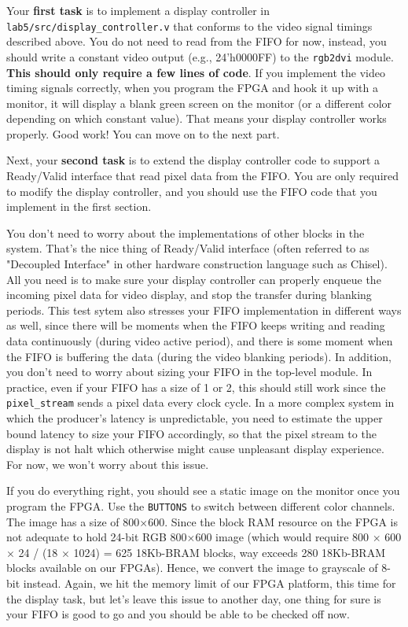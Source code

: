 \documentclass[11pt]{article}
\begin{document}
Your \textbf{first task} is to implement a display controller in \verb|lab5/src/display_controller.v| that conforms to the video signal timings described above. You do not need to read from the FIFO for now, instead, you should write a constant video output (e.g., 24'h0000FF) to the \verb|rgb2dvi| module. \textbf{This should only require a few lines of code}. If you implement the video timing signals correctly, when you program the FPGA and hook it up with a monitor, it will display a blank green screen on the monitor (or a different color depending on which constant value). That means your display controller works properly. Good work! You can move on to the next part.

Next, your \textbf{second task} is to extend the display controller code to support a Ready/Valid interface that read pixel data from the FIFO. You are only required to modify the display controller, and you should use the FIFO code that you implement in the first section.

You don't need to worry about the implementations of other blocks in the system. That's the nice thing of Ready/Valid interface (often referred to as "Decoupled Interface" in other hardware construction language such as Chisel). All you need is to make sure your display controller can properly enqueue the incoming pixel data for video display, and stop the transfer during blanking periods. This test sytem also stresses your FIFO implementation in different ways as well, since there will be moments when the FIFO keeps writing and reading data continuously (during video active period), and there is some moment when the FIFO is buffering the data (during the video blanking periods). In addition, you don't need to worry about sizing your FIFO in the top-level module. In practice, even if your FIFO has a size of 1 or 2, this should still work since the \verb|pixel_stream| sends a pixel data every clock cycle. In a more complex system in which the producer's latency is unpredictable, you need to estimate the upper bound latency to size your FIFO accordingly, so that the pixel stream to the display is not halt which otherwise might cause unpleasant display experience. For now, we won't worry about this issue.

If you do everything right, you should see a static image on the monitor once you program the FPGA. Use the \verb|BUTTONS| to switch between different color channels. The image has a size of 800$\times$600. Since the block RAM resource on the FPGA is not adequate to hold 24-bit RGB 800$\times$600 image (which would require 800 $\times$ 600 $\times$ 24 / (18 $\times$ 1024) = 625 18Kb-BRAM blocks, way exceeds 280 18Kb-BRAM blocks available on our FPGAs). Hence, we convert the image to grayscale of 8-bit instead. Again, we hit the memory limit of our FPGA platform, this time for the display task, but let's leave this issue to another day, one thing for sure is your FIFO is good to go and you should be able to be checked off now.
\end{document}
